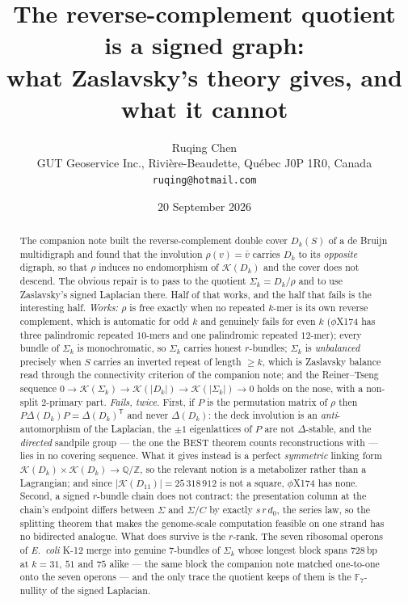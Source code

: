 \documentclass[11pt]{article}
\title{\bfseries The reverse-complement quotient is a signed graph:\\
what Zaslavsky's theory gives, and what it cannot}
\author{Ruqing Chen\\[2pt]
\normalsize GUT Geoservice Inc., Rivi\`ere-Beaudette, Qu\'ebec J0P 1R0, Canada\\
\normalsize\texttt{ruqing@hotmail.com}}
\date{20 September 2026}
\theoremstyle{plain}
\theoremstyle{definition}
\theoremstyle{remark}
\newcommand{\Z}{\mathbb{Z}}
\newcommand{\Q}{\mathbb{Q}}
\newcommand{\K}{\mathcal{K}}
\newcommand{\Sig}{\Sigma}
\begin{document}
\maketitle

\begin{abstract}
\noindent
The companion note built the reverse-complement double cover $D_k(S)$ of a de Bruijn
multidigraph and found that the involution $\rho(v)=\bar v$ carries $D_k$ to its
\emph{opposite} digraph, so that $\rho$ induces no endomorphism of $\K(D_k)$ and the cover
does not descend. The obvious repair is to pass to the quotient $\Sig_k=D_k/\rho$ and to use
Zaslavsky's signed Laplacian there. Half of that works, and the half that fails is the
interesting half. \emph{Works:} $\rho$ is free exactly when no repeated $k$-mer is its own
reverse complement, which is automatic for odd $k$ and genuinely fails for even $k$
($\phi$X174 has three palindromic repeated $10$-mers and one palindromic repeated $12$-mer);
every bundle of $\Sig_k$ is monochromatic, so $\Sig_k$ carries honest $r$-bundles; $\Sig_k$
is \emph{unbalanced} precisely when $S$ carries an inverted repeat of length $\ge k$, which
is Zaslavsky balance read through the connectivity criterion of the companion note; and the
Reiner--Tseng sequence
$0\to\K(\Sig_k)\to\K(|D_k|)\to\K(|\Sig_k|)\to 0$
holds on the nose, with a non-split $2$-primary part.
\emph{Fails, twice.} First, if $P$ is the permutation matrix of $\rho$ then
$P\Delta(D_k)P=\Delta(D_k)^{\mathsf T}$ and never $\Delta(D_k)$: the deck involution is an
\emph{anti}-automorphism of the Laplacian, the $\pm1$ eigenlattices of $P$ are not
$\Delta$-stable, and the \emph{directed} sandpile group --- the one the BEST theorem counts
reconstructions with --- lies in no covering sequence. What it gives instead is a perfect
\emph{symmetric} linking form $\K(D_k)\times\K(D_k)\to\Q/\Z$, so the relevant notion is a
metabolizer rather than a Lagrangian; and since $|\K(D_{11})|=25\,318\,912$ is not a square,
$\phi$X174 has none. Second, a signed $r$-bundle chain does
not contract: the presentation column at the chain's endpoint differs between $\Sig$ and
$\Sig/C$ by exactly $s\,r\,d_0$, the series law, so the splitting theorem that makes the
genome-scale computation feasible on one strand has no bidirected analogue. What does survive
is the $r$-rank. The seven ribosomal operons of \emph{E.\ coli} K-12 merge into genuine
$7$-bundles of $\Sig_k$ whose longest block spans $728$\,bp at $k=31$, $51$ and $75$ alike ---
the same block the companion note matched one-to-one onto the seven operons --- and the only
trace the quotient keeps of them is the $\mathbb{F}_7$-nullity of the signed Laplacian.
\end{abstract}
\end{document}

